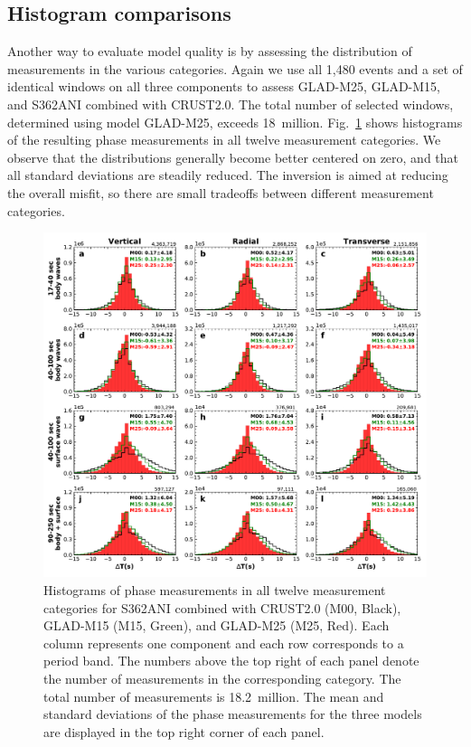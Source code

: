 \documentclass[extra,mreferee]{gji}
\begin{document}
\subsection{Histogram comparisons}
\label{section:Histogram comparisons}

Another way to evaluate model quality is by assessing the distribution
of measurements in the various categories.
Again we use all 1,480 events and a set of identical windows on all three components
to assess GLAD-M25, GLAD-M15, and S362ANI combined with CRUST2.0.
The total number of selected windows,
determined using model GLAD-M25, exceeds 18~million.
Fig.~\ref{fig:phase_hist} shows histograms of the resulting phase
measurements in all twelve measurement categories.
We observe that the distributions generally become better centered on zero,
and that all standard deviations are steadily reduced.
The inversion is aimed at reducing the overall misfit,
so there are small tradeoffs between different measurement categories.

\begin{figure}
  \centering
  \includegraphics[width=\textwidth]{figures/dt_histogram.pdf}
  \caption{\small{Histograms of phase measurements in all twelve measurement categories for S362ANI combined with CRUST2.0 (M00, Black), GLAD-M15 (M15, Green), and GLAD-M25 (M25, Red).
  Each column represents one component and each row corresponds to a period band.
  The numbers above the top right of each panel denote the number of measurements in the corresponding category.
  The total number of measurements is 18.2~million.
  The mean and standard deviations of the phase measurements for the three models are displayed in the top right corner of each panel.}}
  \label{fig:phase_hist}
\end{figure}
\end{document}
